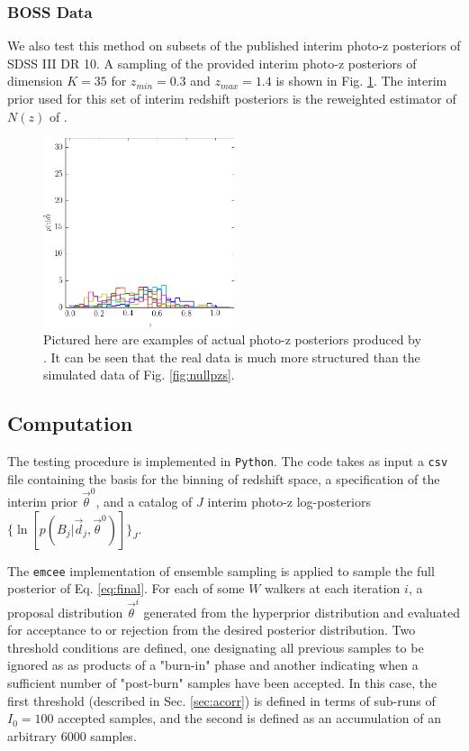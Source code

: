 \documentclass[preprint]{aastex}
\begin{document}
\clearpage
\subsubsection{BOSS Data}
\label{sec:data}

We also test this method on subsets of the published interim photo-z posteriors 
of SDSS III DR 10.  A sampling of the provided interim photo-z posteriors of 
dimension $K=35$ for $z_{min}=0.3$ and $z_{max}=1.4$ is shown in Fig. 
\ref{fig:datapzs}.  The interim prior used for this set of interim redshift 
posteriors is the reweighted estimator of $N(z)$ of \citet{Sheldon2012}.

\begin{figure}
\includegraphics[width=0.5\textwidth]{figs/boss/samplepzs.png}
\caption{Pictured here are examples of actual photo-z posteriors produced by 
\citet{Sheldon2012}.  It can be seen that the real data is much more structured 
than the simulated data of Fig. \ref{fig:nullpzs}.}
\label{fig:datapzs}
\end{figure}

\clearpage
\subsection{Computation}
\label{sec:mcmc}

The testing procedure is implemented in \texttt{Python}.  The code takes as 
input a \texttt{csv} file containing the basis for the binning of redshift 
space, a specification of the interim prior $\vec{\theta}^{0}$, and a catalog 
of $J$ interim photo-z log-posteriors 
$\{\ln[p(B_{j}|\vec{d}_{j},\vec{\theta}^{0})]\}_{J}$.

The \texttt{emcee} \citep{Foreman-Mackey2013} implementation of ensemble 
sampling is applied to sample the full posterior of Eq. \ref{eq:final}.   For 
each of some $W$ walkers at each iteration $i$, a proposal distribution 
$\vec{\theta}^{i}$ generated from the hyperprior distribution and evaluated for 
acceptance to or rejection from the desired posterior distribution.  Two 
threshold conditions are defined, one designating all previous samples to be 
ignored as as products of a "burn-in" phase and another indicating when a 
sufficient number of "post-burn" samples have been accepted.  In this case, the 
first threshold (described in Sec. \ref{sec:acorr}) is defined in terms of 
sub-runs of $I_{0}=100$ accepted samples, and the second is defined as an 
accumulation of an arbitrary 6000 samples.
\end{document}
